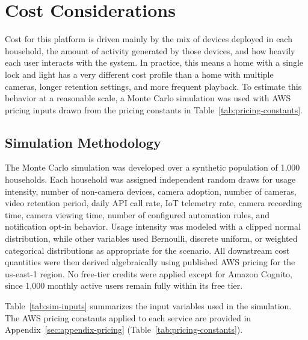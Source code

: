\section{Cost Considerations}
\label{sec:cost}

Cost for this platform is driven mainly by the mix of devices deployed in each household, the amount of activity generated by those devices, and how heavily each user interacts with the system. In practice, this means a home with a single lock and light has a very different cost profile than a home with multiple cameras, longer retention settings, and more frequent playback. To estimate this behavior at a reasonable scale, a Monte Carlo simulation was used with AWS pricing inputs drawn from the pricing constants in Table~\ref{tab:pricing-constants}.

\subsection{Simulation Methodology}

The Monte Carlo simulation was developed over a synthetic population of 1,000 households. Each household was assigned independent random draws for usage intensity, number of non-camera devices, camera adoption, number of cameras, video retention period, daily API call rate, IoT telemetry rate, camera recording time, camera viewing time, number of configured automation rules, and notification opt-in behavior. Usage intensity was modeled with a clipped normal distribution, while other variables used Bernoulli, discrete uniform, or weighted categorical distributions as appropriate for the scenario. All downstream cost quantities were then derived algebraically using published AWS pricing for the us-east-1 region. No free-tier credits were applied except for Amazon Cognito, since 1,000 monthly active users remain fully within its free tier.

Table~\ref{tab:sim-inputs} summarizes the input variables used in the simulation. The AWS pricing constants applied to each service are provided in Appendix~\ref{sec:appendix-pricing} (Table~\ref{tab:pricing-constants}).

